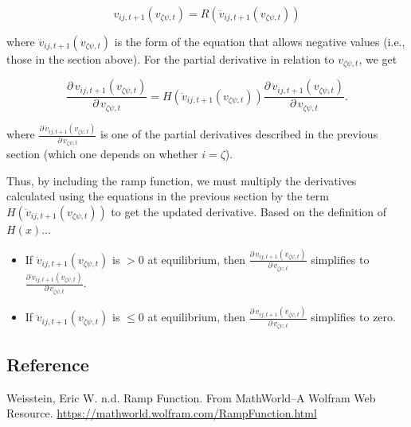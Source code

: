 \begin{equation*}
    v_{ij,t+1}(v_{\zeta\psi,t}) = R(\ddot{v}_{ij,t+1}(v_{\zeta\psi,t}))
\end{equation*}

\noindent where $\ddot{v}_{ij,t+1}(v_{\zeta\psi,t})$ is the form of the equation that
allows negative values (i.e., those in the section above).
For the partial derivative in relation to $v_{\zeta\psi,t}$, we get


\begin{equation*}
    \frac{\partial \, v_{ij,t+1}(v_{\zeta\psi,t})}{\partial \, v_{\zeta\psi,t}} =
        H(\ddot{v}_{ij,t+1}(v_{\zeta\psi,t}))
        \frac{\partial \, \ddot{v}_{ij,t+1}(v_{\zeta\psi,t})}{
            \partial \, v_{\zeta\psi,t} }
\text{.}
\end{equation*}

\noindent where
$\frac{\partial \, \ddot{v}_{ij,t+1}(v_{\zeta\psi,t})}{
\partial \, v_{\zeta\psi,t}}$
is one of the partial derivatives described in the previous section
(which one depends on whether $i = \zeta$).


Thus, by including the ramp function, we must multiply the derivatives
calculated using the equations in the previous section by the term
$H(\ddot{v}_{ij,t+1}(v_{\zeta\psi,t}))$ to get the updated derivative.
Based on the definition of $H(x)$...

\begin{itemize}
    \item If $\ddot{v}_{ij,t+1}(v_{\zeta\psi,t})$ is $> 0$ at equilibrium, then
        $\frac{\partial \, v_{ij,t+1}(v_{\zeta\psi,t})}{
            \partial \, v_{\zeta\psi,t}}$
        simplifies to $\frac{\partial \, \ddot{v}_{ij,t+1}(v_{\zeta\psi,t})}{
            \partial \, v_{\zeta\psi,t}}$.
    \item If $\ddot{v}_{ij,t+1}(v_{\zeta\psi,t})$ is $\le 0$ at equilibrium, then
        $\frac{\partial \, v_{ij,t+1}(v_{\zeta\psi,t})}{
            \partial \, v_{\zeta\psi,t}}$
        simplifies to zero.
\end{itemize}




\subsection*{Reference}

Weisstein, Eric W. n.d. Ramp Function.
From MathWorld--A Wolfram Web Resource.
\url{https://mathworld.wolfram.com/RampFunction.html}
